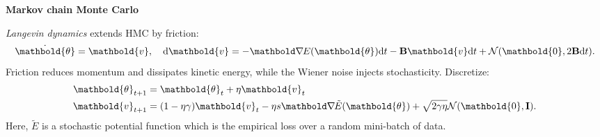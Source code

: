 \documentclass[10pt]{article}
\newenvironment{topic}[1]
{\textbf{\sffamily \footnotesize \colorbox{black}{\rlap{\textbf{\textcolor{white}{#1}}}\hspace{\linewidth}\hspace{-2\fboxsep}}}}
{}
\newenvironment{subtopic}[1]
{\vspace{0.1cm} \begin{center}\textbf{\footnotesize \sffamily #1}\end{center}}
{}
\renewcommand{\mat}[1]{\ensuremath{\mathbf{#1}}}
\renewcommand{\vec}[1]{\ensuremath{\mathbold{#1}}}
\begin{document}
\begin{multicols*}{3}
\begin{topic}{Bayesian learning}
\begin{subtopic}{Markov chain Monte Carlo}
            \textit{Langevin dynamics} extends HMC by friction: \[
                \dot{\vec{\theta}} = \vec{v}, \quad \mathrm{d}\vec{v} = -\grad{E(\vec{\theta})}{} \mathrm{d}t - \mat{B} \vec{v}\mathrm{d}t + \mathcal{N}(\vec{0}, 2 \mat{B} \mathrm{d}t).
            \]
            Friction reduces momentum and dissipates kinetic energy, while the Wiener noise injects
            stochasticity. Discretize:
            \begin{align*}
                \vec{\theta}_{t+1} & = \vec{\theta}_t + \eta \vec{v}_t                                                                                           \\
                \vec{v}_{t+1}      & = (1-\eta \gamma) \vec{v}_t - \eta s \grad{\tilde{E}(\vec{\theta})}{} + \sqrt{2 \gamma \eta} \mathcal{N}(\vec{0}, \mat{I}).
            \end{align*}
            Here, $\tilde{E}$ is a stochastic potential function which is the empirical loss over a random
            mini-batch of data.
        \end{subtopic}


\end{topic}
\end{multicols*}
\end{document}
